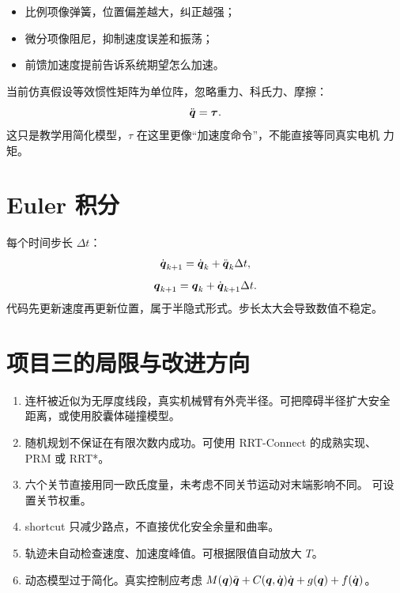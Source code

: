 \begin{itemize}
  \item 比例项像弹簧，位置偏差越大，纠正越强；
  \item 微分项像阻尼，抑制速度误差和振荡；
  \item 前馈加速度提前告诉系统期望怎么加速。
\end{itemize}

当前仿真假设等效惯性矩阵为单位阵，忽略重力、科氏力、摩擦：
\[
\ddot{\boldsymbol{q}}=\boldsymbol{\tau}.
\]
这只是教学用简化模型，$\tau$ 在这里更像“加速度命令”，不能直接等同真实电机
力矩。

\section{Euler 积分}

每个时间步长 $\Delta t$：
\[
\dot{\boldsymbol{q}}_{k+1}=\dot{\boldsymbol{q}}_k+\ddot{\boldsymbol{q}}_k\Delta t,
\]
\[
\boldsymbol{q}_{k+1}=\boldsymbol{q}_k+\dot{\boldsymbol{q}}_{k+1}\Delta t.
\]
代码先更新速度再更新位置，属于半隐式形式。步长太大会导致数值不稳定。

\section{项目三的局限与改进方向}

\begin{enumerate}
  \item 连杆被近似为无厚度线段，真实机械臂有外壳半径。可把障碍半径扩大安全
  距离，或使用胶囊体碰撞模型。
  \item 随机规划不保证在有限次数内成功。可使用 RRT-Connect 的成熟实现、
  PRM 或 RRT*。
  \item 六个关节直接用同一欧氏度量，未考虑不同关节运动对末端影响不同。
  可设置关节权重。
  \item shortcut 只减少路点，不直接优化安全余量和曲率。
  \item 轨迹未自动检查速度、加速度峰值。可根据限值自动放大 $T$。
  \item 动态模型过于简化。真实控制应考虑
  $M(\boldsymbol{q})\ddot{\boldsymbol{q}}+C(\boldsymbol{q},\dot{\boldsymbol{q}})\dot{\boldsymbol{q}}+g(\boldsymbol{q})+f(\dot{\boldsymbol{q}})$。
\end{enumerate}
